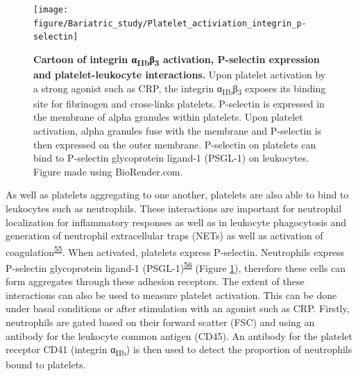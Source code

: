 \documentclass[11pt,twoside]{bristolthesis}
\begin{document}
\begin{figure}

{\centering \texttt{[image: figure/Bariatric\_study/Platelet\_activiation\_integrin\_p-selectin]} 

}

\caption[Cartoon of integrin α\textsubscript{IIb}β\textsubscript{3} activation, P-selectin expression and platelet-leukocyte interactions]{\textbf{Cartoon of integrin α\textsubscript{IIb}β\textsubscript{3} activation, P-selectin expression and platelet-leukocyte interactions.} Upon platelet activation by a strong agonist such as CRP, the integrin α\textsubscript{IIb}β\textsubscript{3} exposes its binding site for fibrinogen and cross-links platelets. P-selectin is expressed in the membrane of alpha granules within platelets. Upon platelet activation, alpha granules fuse with the membrane and P-selectin is then expressed on the outer membrane. P-selectin on platelets can bind to P-selectin glycoprotein ligand-1 (PSGL-1) on leukocytes. Figure made using BioRender.com.}\label{fig:platelet-activation-background}
\end{figure}
As well as platelets aggregating to one another, platelets are also able to bind to leukocytes such as neutrophils. These interactions are important for neutrophil localization for inflammatory responses as well as in leukocyte phagocytosis and generation of neutrophil extracellular traps (NETs) as well as activation of coagulation\textsuperscript{\protect\hyperlink{ref-Lisman2018}{55}}. When activated, platelets express P-selectin. Neutrophils express P-selectin glycoprotein ligand-1 (PSGL-1)\textsuperscript{\protect\hyperlink{ref-Zarbock2007}{56}} (Figure \ref{fig:platelet-activation-background}), therefore these cells can form aggregates through these adhesion receptors. The extent of these interactions can also be used to measure platelet activation. This can be done under basal conditions or after stimulation with an agonist such as CRP. Firstly, neutrophils are gated based on their forward scatter (FSC) and using an antibody for the leukocyte common antigen (CD45). An antibody for the platelet receptor CD41 (integrin α\textsubscript{IIb}) is then used to detect the proportion of neutrophils bound to platelets.
\end{document}
